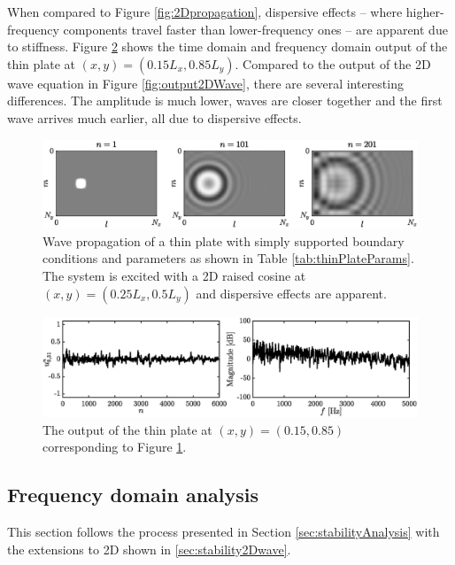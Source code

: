{\renewcommand{\arraystretch}{1}

When compared to Figure \ref{fig:2Dpropagation}, dispersive effects -- where higher-frequency components travel faster than lower-frequency ones -- are apparent due to stiffness. Figure \ref{fig:outputThinPlate} shows the time domain and frequency domain output of the thin plate at $(x,y) = (0.15L_x, 0.85 L_y)$.
Compared to the output of the 2D wave equation in Figure \ref{fig:output2DWave}, there are several interesting differences. The amplitude is much lower, waves are closer together and the first wave arrives much earlier, all due to dispersive effects.
\begin{figure}[h]
    \centering
    \includegraphics[width = \textwidth]{figures/resonators/2d/thinPlatePropagation.eps}
    \caption{Wave propagation of a thin plate with simply supported boundary conditions and parameters as shown in Table \ref{tab:thinPlateParams}. The system is excited with a 2D raised cosine at $(x,y) = (0.25L_x, 0.5L_y)$ and dispersive effects are apparent.\label{fig:thinPlatePropagation}}
\end{figure}

\begin{figure}[h]
    \centering
    \includegraphics[width=\textwidth]{figures/resonators/2d/outputThinPlate.eps}
    \caption{The output of the thin plate at $(x,y) = (0.15, 0.85)$ corresponding to Figure \ref{fig:thinPlatePropagation}. \label{fig:outputThinPlate}}
\end{figure}

\subsection{Frequency domain analysis}\label{sec:stabilityThinPlate}
This section follows the process presented in Section \ref{sec:stabilityAnalysis} with the extensions to 2D shown in \ref{sec:stability2Dwave}.

}
